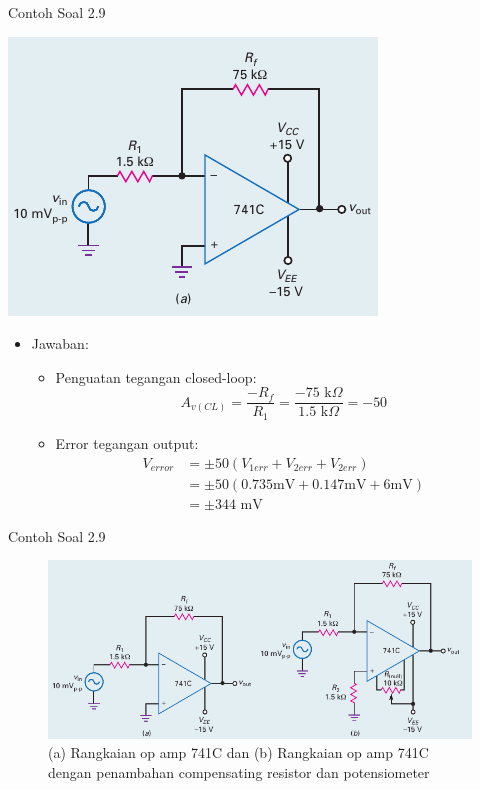 \begin{frame}{Contoh Soal 2.9}
	\begin{multicols}{2}
		\begin{center}
			\includegraphics[width=\linewidth]{gambar/fig-16.17a}
		\end{center}
		\columnbreak
		\begin{itemize}
			\item Jawaban:
			\begin{itemize}
				\item Penguatan tegangan closed-loop:
				\[ A_{v(CL)} = \frac{-R_f}{R_1} = \frac{-75 \text{ k}\Omega}{1.5 \text{ k}\Omega} = -50\]
				\item Error tegangan output:
				\begin{align*}
					V_{error} &= \pm 50 (V_{1err} + V_{2err} + V_{2err}) \\
					&= \pm 50 (0.735 \text{mV} + 0.147 \text{mV} + 6 \text{mV}) \\
					&= \pm 344 \text{ mV}
				\end{align*}
			\end{itemize}
		\end{itemize}
	\end{multicols}
\end{frame}

\begin{frame}{Contoh Soal 2.9}
	\begin{figure}
		\centering
		\includegraphics[width=0.8\linewidth]{gambar/fig-16.17}
		\caption{(a) Rangkaian op amp 741C dan (b) Rangkaian op amp 741C dengan penambahan compensating resistor dan potensiometer}
		\label{fig-16.17}
	\end{figure}
	
\end{frame}
